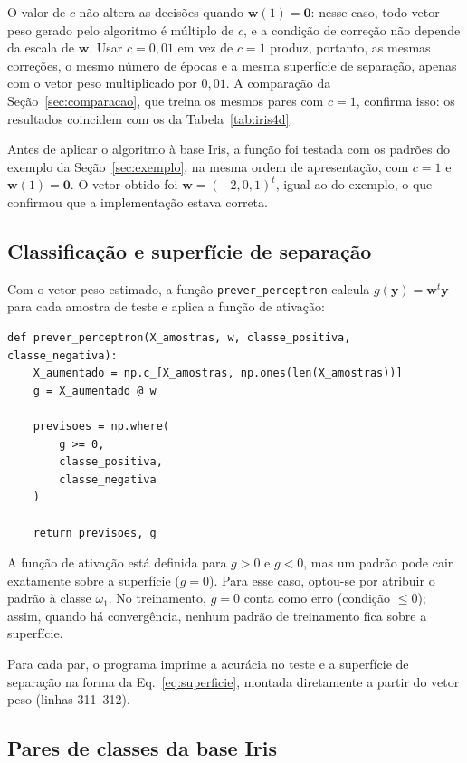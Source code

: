 \documentclass[12pt,a4paper]{article}
\begin{document}
O valor de $c$ não altera as decisões quando $\mathbf{w}(1) = \mathbf{0}$: nesse caso, todo vetor peso gerado pelo algoritmo é múltiplo de $c$, e a condição de correção não depende da escala de $\mathbf{w}$. Usar $c = 0{,}01$ em vez de $c = 1$ produz, portanto, as mesmas correções, o mesmo número de épocas e a mesma superfície de separação, apenas com o vetor peso multiplicado por $0{,}01$. A comparação da Seção~\ref{sec:comparacao}, que treina os mesmos pares com $c = 1$, confirma isso: os resultados coincidem com os da Tabela~\ref{tab:iris4d}.

Antes de aplicar o algoritmo à base Iris, a função foi testada com os padrões do exemplo da Seção~\ref{sec:exemplo}, na mesma ordem de apresentação, com $c = 1$ e $\mathbf{w}(1) = \mathbf{0}$. O vetor obtido foi $\mathbf{w} = (-2, 0, 1)^t$, igual ao do exemplo, o que confirmou que a implementação estava correta.

\subsection{Classificação e superfície de separação}

Com o vetor peso estimado, a função \texttt{prever\_perceptron} calcula $g(\mathbf{y}) = \mathbf{w}^t\mathbf{y}$ para cada amostra de teste e aplica a função de ativação:

\begin{lstlisting}[firstnumber=234,title=\texttt{pr4\_perceptron\_iris\_colab.py}]
def prever_perceptron(X_amostras, w, classe_positiva, classe_negativa):
    X_aumentado = np.c_[X_amostras, np.ones(len(X_amostras))]
    g = X_aumentado @ w

    previsoes = np.where(
        g >= 0,
        classe_positiva,
        classe_negativa
    )

    return previsoes, g
\end{lstlisting}

A função de ativação está definida para $g > 0$ e $g < 0$, mas um padrão pode cair exatamente sobre a superfície ($g = 0$). Para esse caso, optou-se por atribuir o padrão à classe $\omega_1$. No treinamento, $g = 0$ conta como erro (condição $\leq 0$); assim, quando há convergência, nenhum padrão de treinamento fica sobre a superfície.

Para cada par, o programa imprime a acurácia no teste e a superfície de separação na forma da Eq.~\eqref{eq:superficie}, montada diretamente a partir do vetor peso (linhas 311--312).

\subsection{Pares de classes da base Iris}
\end{document}
